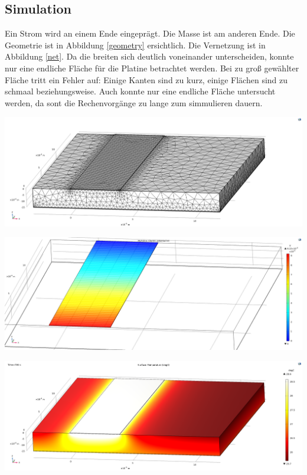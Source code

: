 \documentclass[10pt,a4paper,oneside,abstracton]{scrartcl}
\newenvironment{Figure}
  {\par\medskip\noindent\minipage{\linewidth}}
  {\endminipage\par\medskip}
\begin{document}
\begin{multicols}{2}
\section{Simulation}
Ein Strom wird an einem Ende eingeprägt. Die Masse ist am anderen Ende. 
Die Geometrie ist in Abbildung \ref*{geometry} ersichtlich. Die Vernetzung ist in Abbildung \ref*{net}.
Da die breiten sich deutlich voneinander unterscheiden, konnte nur eine endliche Fläche für die Platine betrachtet werden.
Bei zu groß gewählter Fläche tritt ein Fehler auf: Einige Kanten sind zu kurz, einige Flächen sind zu schmaal beziehungsweise. 
Auch konnte nur eine endliche Fläche untersucht werden, da sont die Rechenvorgänge zu lange zum simmulieren dauern. 


\begin{Figure}
	\includegraphics[width=\textwidth]{Bilder/net.png}
	\label{net}
\end{Figure}


\begin{Figure}
	\includegraphics[width=\textwidth]{Bilder/voltage.png}
	\label{voltage}
\end{Figure}

\begin{Figure}
	\includegraphics[width=\textwidth]{Bilder/Thermal_static.png}
	\label{voltage}
\end{Figure}


\end{multicols}
\end{document}
